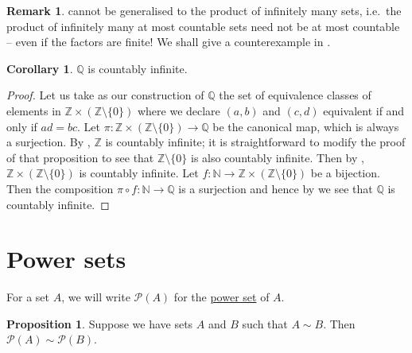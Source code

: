 \documentclass[12pt]{article}
\theoremstyle{definition}
\newtheorem{proposition}[definition]{Proposition}
\newtheorem{corollary}[definition]{Corollary}
\newtheorem*{remark}{Remark}
\begin{document}
\begin{remark}
     cannot be generalised to the product of infinitely many sets, i.e.\ the product of infinitely many at most countable sets need not be at most countable -- even if the factors are finite! We shall give a counterexample in .
\end{remark}

\begin{corollary}
\label{cor:Q_is_countable}
    \( \mathbb{Q} \) is countably infinite.
\end{corollary}

\begin{proof}
    Let us take as our construction of \( \mathbb{Q} \) the set of equivalence classes of elements in \( \mathbb{Z} \times (\mathbb{Z} \setminus \{ 0 \}) \) where we declare \( (a, b) \) and \( (c, d) \) equivalent if and only if \( ad = bc \). Let \( \pi : \mathbb{Z} \times (\mathbb{Z} \setminus \{ 0 \}) \to \mathbb{Q} \) be the canonical map, which is always a surjection. By , \( \mathbb{Z} \) is countably infinite; it is straightforward to modify the proof of that proposition to see that \( \mathbb{Z} \setminus \{ 0 \} \) is also countably infinite. Then by , \( \mathbb{Z} \times (\mathbb{Z} \setminus \{ 0 \}) \) is countably infinite. Let \( f : \mathbb{N} \to \mathbb{Z} \times (\mathbb{Z} \setminus \{ 0 \}) \) be a bijection. Then the composition \( \pi \circ f : \mathbb{N} \to \mathbb{Q} \) is a surjection and hence by  we see that \( \mathbb{Q} \) is countably infinite.
\end{proof}

\section{Power sets}
\label{sec:power_sets}

For a set \( A \), we will write \( \mathscr{P}(A) \) for the \href{https://en.wikipedia.org/wiki/Power_set}{power set} of \( A \).

\begin{proposition}
\label{prop:bijection_between_sets_implies_bijection_between_power_sets}
    Suppose we have sets \( A \) and \( B \) such that \( A \sim B \). Then \( \mathscr{P}(A) \sim \mathscr{P}(B) \).
\end{proposition}
\end{document}
